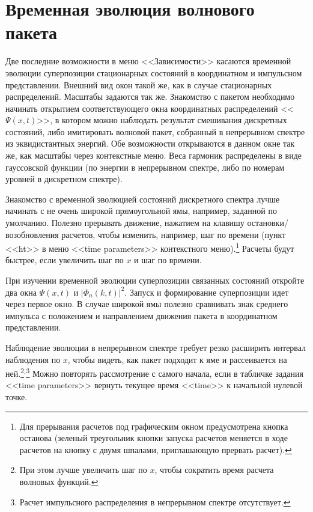 \documentclass[12pt]{article}
\begin{document}
\hypertarget{psixt}{}\section{Временная эволюция волнового пакета}
Две последние возможности в меню <<Зависимости>> касаются временной эволюции суперпозиции стационарных состояний
в координатном и импульсном представлении. Внешний вид окон такой же, как в случае стационарных распределений.
Масштабы задаются так же. Знакомство с пакетом необходимо начинать открытием соответствующего окна координатных
распределений <<$\Psi(x,t)$>>, в котором можно наблюдать результат смешивания дискретных состояний, либо имитировать волновой пакет,
собранный в непрерывном спектре из эквидистантных  энергий. Обе возможности открываются в данном окне так же,
как масштабы через контекстные меню. Веса гармоник распределены в виде гауссовской функции (по энергии в непрерывном
спектре, либо по номерам уровней в дискретном спектре).

Знакомство с временной эволюцией состояний дискретного спектра лучше начинать с не очень широкой прямоугольной ямы,
например, заданной по умолчанию. Полезно прерывать движение, нажатием на клавишу остановки/\hskip0pt возобновления расчетов,
чтобы изменить, например, шаг по времени (пункт <<ht>> в меню <<time parame\-ters>> контекстного меню).\footnote[10] {Для прерывания расчетов под графическим окном предусмотрена кнопка останова (зеленый треугольник кнопки запуска
расчетов меняется в ходе расчетов на кнопку с двумя шпалами, приглашающую прервать расчет).} Расчеты будут быстрее,
если увеличить шаг по $x$ и шаг по времени.

При изучении временной эволюции суперпозиции связанных состояний откройте два окна $\Psi(x,t)$ и $|\Phi_n(k,t)|^2$.
Запуск и формирование суперпозиции идет через первое окно. В случае широкой ямы полезно сравнивать знак среднего
импульса с положением и направлением движения пакета в координатном представлении.

Наблюдение эволюции в непрерывном спектре требует резко расширить интервал наблюдения по $x$, чтобы видеть, как
пакет подходит к яме и рассеивается на ней.\footnote[11] {При этом лучше увеличить шаг по $x$, чтобы сократить время расчета
волновых функций.}$^,$\footnote[12]{Расчет импульсного распределения в непрерывном спектре отсутствует.} Можно повторять рассмотрение с самого начала, если в табличке задания <<time parame\-ters>>
вернуть текущее время <<time>> к начальной нулевой точке.
\end{document}

